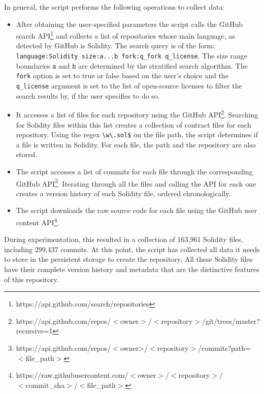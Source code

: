 \documentclass[10pt,conference]{IEEEtran}
\begin{document}
\begin{itemize}
		In general, the script performs the following operations to collect data:
		\begin{itemize}
			\item After obtaining the user-specified parameters the script calls the GitHub search API\footnote{https://api.github.com/search/repositories} and collects a list of repositories whose main language, as detected by GitHub is Solidity. The search query is of the form: \texttt{language:Solidity size:a...b fork:q\_fork q\_license}. The size range boundaries \texttt{a} and \texttt{b} are determined by the stratified search algorithm. The \texttt{fork} option is set to true or false based on the user's choice and the \texttt{q\_license} argument is set to the list of open-source licenses to filter the search results by, if the user specifies to do so.
			\item It accesses a list of files for each repository using the GitHub API\footnote{https://api.github.com/repos/$<$owner$>$/$<$repository$>$/git/trees/master?\\recursive=1}. Searching for Solidity files within this list creates a collection of contract files for each repository. Using the regex \texttt{\textbackslash w\textbackslash .sol\$} on the file path, the script determines if a file is written in Solidity. For each file, the path and the repository are also stored.
			\item The script accesses a list of commits for each file through the corresponding GitHub API\footnote{ https://api.github.com/repos/$<$owner>/$<$repository$>$/commits?path=\\$<$file\_path$>$}. Iterating through all the files and calling the API for each one creates a version history of each Solidity file, ordered chronologically.
			\item The script downloads the raw source code for each file using the GitHub user content API\footnote{ https://raw.githubusercontent.com/$<$owner$>$/$<$repository$>$/\\$<$commit\_sha$>$/$<$file\_path$>$}.
		\end{itemize}
		
		During experimentation, this resulted in a collection of 163,961 Solidity files, including 299,437 commits. At this point, the script has collected all data it needs to store in the persistent storage to create the repository. All these 
		Solidity files have their complete version history and metadata that are the distinctive features of this repository.
		

\end{itemize}
\end{document}
